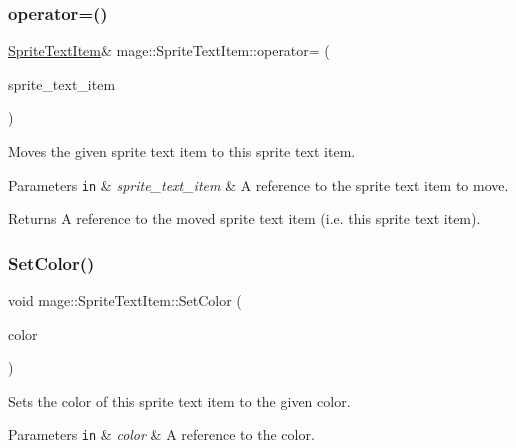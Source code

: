 \subsubsection{\texorpdfstring{operator=()}{operator=()}\hspace{0.1cm}{\footnotesize\ttfamily [2/2]}}
{\footnotesize\ttfamily \hyperlink{structmage_1_1_sprite_text_item}{Sprite\+Text\+Item}\& mage\+::\+Sprite\+Text\+Item\+::operator= (\begin{DoxyParamCaption}\item[{\hyperlink{structmage_1_1_sprite_text_item}{Sprite\+Text\+Item} \&\&}]{sprite\+\_\+text\+\_\+item }\end{DoxyParamCaption})\hspace{0.3cm}{\ttfamily [default]}}

Moves the given sprite text item to this sprite text item.


\begin{DoxyParams}[1]{Parameters}
\mbox{\tt in}  & {\em sprite\+\_\+text\+\_\+item} & A reference to the sprite text item to move. \\
\hline
\end{DoxyParams}
\begin{DoxyReturn}{Returns}
A reference to the moved sprite text item (i.\+e. this sprite text item). 
\end{DoxyReturn}
\hypertarget{structmage_1_1_sprite_text_item_ad5440a79f5f08d3fe8d4b58f69a88f3c}{}\label{structmage_1_1_sprite_text_item_ad5440a79f5f08d3fe8d4b58f69a88f3c} 
\subsubsection{\texorpdfstring{Set\+Color()}{SetColor()}\hspace{0.1cm}{\footnotesize\ttfamily [1/2]}}
{\footnotesize\ttfamily void mage\+::\+Sprite\+Text\+Item\+::\+Set\+Color (\begin{DoxyParamCaption}\item[{const \hyperlink{structmage_1_1_color}{Color} \&}]{color }\end{DoxyParamCaption})}

Sets the color of this sprite text item to the given color.


\begin{DoxyParams}[1]{Parameters}
\mbox{\tt in}  & {\em color} & A reference to the color. \\
\hline
\end{DoxyParams}
\hypertarget{structmage_1_1_sprite_text_item_a534551b3c7a135049984d19318004f82}{}\label{structmage_1_1_sprite_text_item_a534551b3c7a135049984d19318004f82} 
